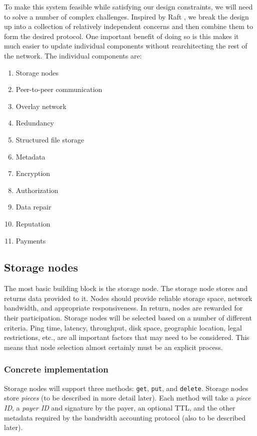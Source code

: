 \documentclass[a4paper,10pt]{article}
\newcommand{\code}[1]{{\tt #1}}
\begin{document}
To make this system feasible while satisfying our design constraints, we will
need to solve a number of complex challenges. Inspired by Raft \cite{raft}, we
break the design up into a collection of relatively independent concerns
and then combine them to form the desired protocol. 
One important benefit of doing so is this makes it much easier to
update individual components without rearchitecting the rest of the
network. The individual components are:

\begin{enumerate}
\item Storage nodes
\item Peer-to-peer communication
\item Overlay network
\item Redundancy
\item Structured file storage
\item Metadata
\item Encryption
\item Authorization
\item Data repair
\item Reputation
\item Payments
\end{enumerate}

\subsection{Storage nodes}

The most basic building block is the storage node. The storage node stores and returns data provided to it. Nodes should provide reliable storage space, network bandwidth, and appropriate responsiveness. In return, nodes are rewarded for their participation. Storage nodes will be selected based on a number of different criteria. Ping time, latency, throughput, disk space, geographic location, legal restrictions, etc., are all important factors that may need to be considered.
This means that node selection almost certainly must be an explicit process.

\subsubsection{Concrete implementation}

Storage nodes will support three methods: \code{get}, \code{put}, and
\code{delete}.
Storage nodes store {\em pieces} (to be described in more detail later).
Each method will take
  a {\em piece ID},
  a {\em payer ID} and signature by the payer,
  an optional TTL,
  and the other metadata required by the bandwidth accounting protocol (also
    to be described later).
\end{document}
